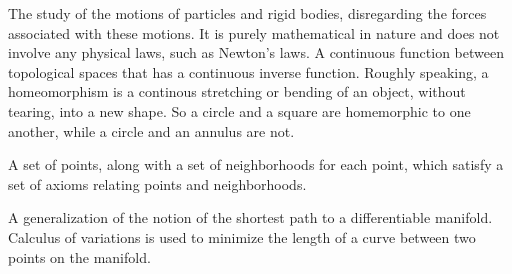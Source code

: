 
{
    The study of the motions of particles and rigid bodies, disregarding the forces associated with these motions.
    It is purely mathematical in nature and does not involve any physical laws, such as Newton's laws.
}
{
   A continuous function between topological spaces that has a continuous inverse function.
   Roughly speaking, a homeomorphism is a continous stretching or bending of an object, without tearing, into a new shape. 
   So a circle and a square are homemorphic to one another, while a circle and an annulus are not.
}

{
    A set of points, along with a set of neighborhoods for each point, which satisfy a set of axioms relating points and neighborhoods.
}

{
    A generalization of the notion of the shortest path to a differentiable manifold. 
    Calculus of variations is used to minimize the length of a curve between two points on the manifold.
}
